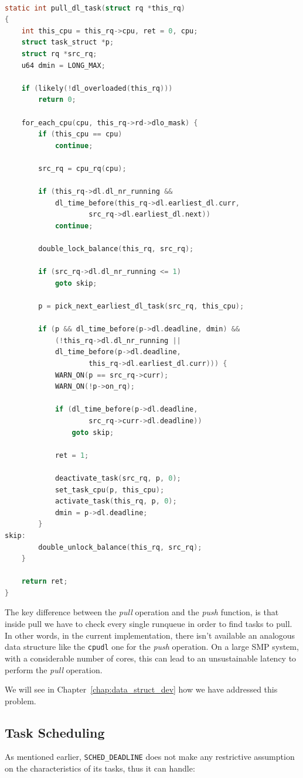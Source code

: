 \begin{lstlisting}[language=C, caption={\texttt{\emph{pull\_dl\_task} function}},
				label={lst:pull_dl_task}]

static int pull_dl_task(struct rq *this_rq)
{
	int this_cpu = this_rq->cpu, ret = 0, cpu;
	struct task_struct *p;
	struct rq *src_rq;
	u64 dmin = LONG_MAX;

	if (likely(!dl_overloaded(this_rq)))
		return 0;

	for_each_cpu(cpu, this_rq->rd->dlo_mask) {
		if (this_cpu == cpu)
			continue;

		src_rq = cpu_rq(cpu);
		
		if (this_rq->dl.dl_nr_running &&
			dl_time_before(this_rq->dl.earliest_dl.curr,
					src_rq->dl.earliest_dl.next))
			continue;
		
		double_lock_balance(this_rq, src_rq);
		
		if (src_rq->dl.dl_nr_running <= 1)
			goto skip;

		p = pick_next_earliest_dl_task(src_rq, this_cpu);

		if (p && dl_time_before(p->dl.deadline, dmin) &&
			(!this_rq->dl.dl_nr_running ||
			dl_time_before(p->dl.deadline,
					this_rq->dl.earliest_dl.curr))) {
			WARN_ON(p == src_rq->curr);
			WARN_ON(!p->on_rq);

			if (dl_time_before(p->dl.deadline,
					src_rq->curr->dl.deadline))
				goto skip;

			ret = 1;

			deactivate_task(src_rq, p, 0);
			set_task_cpu(p, this_cpu);
			activate_task(this_rq, p, 0);
			dmin = p->dl.deadline;
		}
skip:
		double_unlock_balance(this_rq, src_rq);
	}

	return ret;
}

\end{lstlisting}

The key difference between the \emph{pull} operation and the
\emph{push} function, is that inside pull we have to check every
single runqueue in order to find tasks to pull. In other words, in the
current implementation, there isn't available an analogous data
structure like the \texttt{cpudl} one for the \emph{push} operation.
On a large SMP system, with a considerable number of cores, this can
lead to an unsustainable latency to perform the \emph{pull} operation.

We will see in Chapter~\ref{chap:data_struct_dev} how we have addressed this problem.

\subsection{Task Scheduling}\label{sec:schedDead_scheduling}
As mentioned earlier, \texttt{SCHED\_DEADLINE} does not make any
restrictive assumption on the characteristics of its tasks, thus it
can handle:


